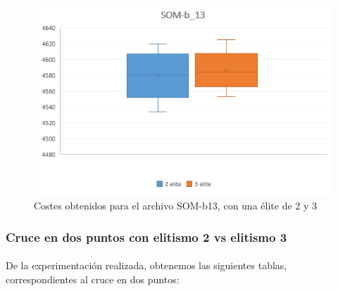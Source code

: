 	\begin{figure}[H]
		\centering
		\includegraphics[scale=0.7]{img/MPX_2vs3/SOM-b_13_Costes}
		\caption{Costes obtenidos para el archivo SOM-b13, con una élite de 2 y 3}
		\label{som-b13_coste}
		
		
	\end{figure}


	\subsubsection{Cruce en dos puntos con elitismo 2 vs elitismo 3}
	
	\paragraph{}De la experimentación realizada, obtenemos las siguientes tablas, correspondientes al cruce en dos puntos:
	
